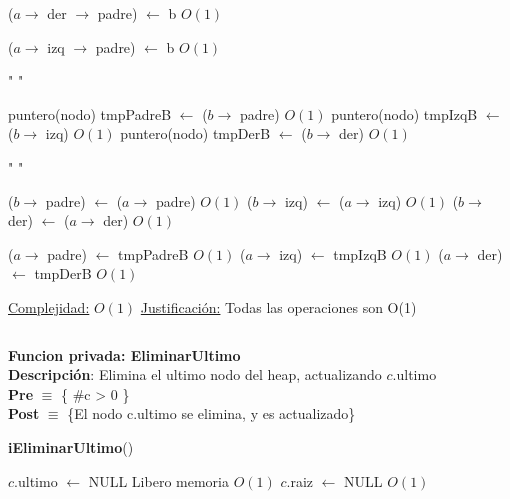 \begin{Algoritmos}
\begin{algorithm}[H]
\begin{algorithmic}[1]
        \State ($a \to$ der $\to$ padre) $\gets$ b \Comment $O(1)$
    \EndIf

        \State ($a \to$ izq $\to$ padre) $\gets$ b \Comment $O(1)$
    \EndIf

    \State " "

    \State puntero(nodo) tmpPadreB $\gets$ ($b \to$ padre) \Comment $O(1)$
    \State puntero(nodo) tmpIzqB $\gets$ ($b \to$ izq) \Comment $O(1)$
    \State puntero(nodo) tmpDerB $\gets$ ($b \to$ der) \Comment $O(1)$

    \State " "

    \State ($b \to$ padre) $\gets$ ($a \to$ padre) \Comment $O(1)$
    \State ($b \to$ izq) $\gets$ ($a \to$ izq) \Comment $O(1)$
    \State ($b \to$ der) $\gets$ ($a \to$ der) \Comment $O(1)$

    \State ($a \to$ padre) $\gets$ tmpPadreB \Comment $O(1)$
    \State ($a \to$ izq) $\gets$ tmpIzqB \Comment $O(1)$
    \State ($a \to$ der) $\gets$ tmpDerB \Comment $O(1)$


    \medskip
    \Statex \underline{Complejidad:} $O(1)$
    \Statex \underline{Justificaci\'on:} Todas las operaciones son O(1)

\end{algorithmic}
\end{algorithm}

$ $\newline

\textbf{Funcion privada: EliminarUltimo}\\
\textbf{Descripci\'on}: Elimina el ultimo nodo del heap, actualizando $c$.ultimo\\
\textbf{Pre} $\equiv$ \{ $\#$c > 0 \}\\%
\textbf{Post} $\equiv$ \{El nodo c.ultimo se elimina, y es actualizado\}%
\begin{algorithm}[H]
{\textbf{iEliminarUltimo}()}
\begin{algorithmic}[1]

        \State $c$.ultimo $\gets$ NULL \Comment Libero memoria $O(1)$
        \State $c$.raiz $\gets$ NULL \Comment $O(1)$
    \Else


\end{algorithmic}
\end{algorithm}
\end{Algoritmos}
